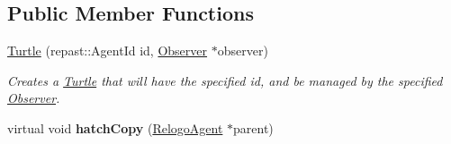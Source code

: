 \subsection*{Public Member Functions}
\begin{DoxyCompactItemize}
\item 
\hypertarget{classrepast_1_1relogo_1_1_turtle_aaa772cfde975ea37fa795c1cafdbb0df}{\hyperlink{classrepast_1_1relogo_1_1_turtle_aaa772cfde975ea37fa795c1cafdbb0df}{Turtle} (repast\-::\-Agent\-Id id, \hyperlink{classrepast_1_1relogo_1_1_observer}{Observer} $\ast$observer)}\label{classrepast_1_1relogo_1_1_turtle_aaa772cfde975ea37fa795c1cafdbb0df}

\begin{DoxyCompactList}\small\item\em Creates a \hyperlink{classrepast_1_1relogo_1_1_turtle}{Turtle} that will have the specified id, and be managed by the specified \hyperlink{classrepast_1_1relogo_1_1_observer}{Observer}. \end{DoxyCompactList}\item 
\hypertarget{classrepast_1_1relogo_1_1_turtle_a0995104470db5a506b8e5d5a2e29c45c}{virtual void {\bfseries hatch\-Copy} (\hyperlink{classrepast_1_1relogo_1_1_relogo_agent}{Relogo\-Agent} $\ast$parent)}\label{classrepast_1_1relogo_1_1_turtle_a0995104470db5a506b8e5d5a2e29c45c}


\end{DoxyCompactItemize}
